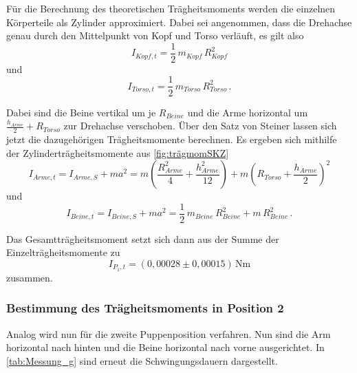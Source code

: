 Für die Berechnung des theoretischen Trägheitsmoments werden die einzelnen Körperteile als Zylinder approximiert. Dabei sei angenommen, dass die Drehachse genau durch den Mittelpunkt von Kopf und Torso verläuft, es gilt also
\begin{equation*}
  I_{Kopf,t} = \frac{1}{2} \, m_{Kopf} \, R^2_{Kopf}
\end{equation*}
und
\begin{equation*}
  I_{Torso,t} = \frac{1}{2} \, m_{Torso} \, R^2_{Torso} \,.
\end{equation*}

Dabei sind die Beine vertikal um je $R_{Beine}$ und die Arme horizontal um $\frac{h_{Arme}}{2} + R_{Torso}$ zur Drehachse verschoben. 
Über den Satz von Steiner lassen sich jetzt die dazugehörigen Trägheitsmomente berechnen.
Es ergeben sich mithilfe der Zylinderträgheitsmomente aus \autoref{fig:trägmomSKZ}
\begin{equation*}
  I_{Arme,t} = I_{Arme,S} + m a^2 = m \left(\frac{R^2_{Arme}}{4} + \frac{h^2_{Arme}}{12} \right) + m \left(R_{Torso} + \frac{h_{Arme}}{2} \right)^2
\end{equation*}
und
\begin{equation*}
  I_{Beine,t} = I_{Beine,S} + m a^2 = \frac{1}{2} \, m_{Beine} \, R^2_{Beine} + m \, R^2_{Beine}\,.
\end{equation*}

Das Gesamtträgheitsmoment setzt sich dann aus der Summe der Einzelträgheitsmomente zu
\begin{equation*}
  I_{P_1,t} = (0,00028 \pm 0,00015) \, \unit{\newton\meter}
\end{equation*}
zusammen.

\newpage

\subsubsection{Bestimmung des Trägheitsmoments in Position 2}
\label{subsubsec:pos2}

Analog wird nun für die zweite Puppenposition verfahren. 
Nun sind die Arm horizontal nach hinten und die Beine horizontal nach vorne ausgerichtet. 
In \autoref{tab:Messung_g} sind erneut die Schwingungsdauern dargestellt.

